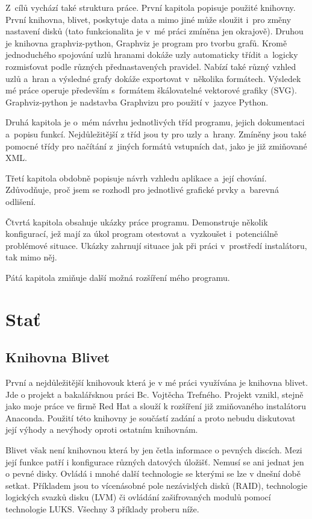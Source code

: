 \documentclass[color,table,oneside,nolot,nolof]{fithesis}
\begin{document}
	Z~cílů vychází také struktura práce. První kapitola popisuje použité knihovny. První knihovna, blivet\cite{blivet}, poskytuje data a mimo jiné může sloužit i~pro změny 
	nastavení disků (tato funkcionalita je v~mé práci zmíněna jen okrajově). Druhou je knihovna graphviz-python\cite{graphviz-python}, Graphviz je program pro tvorbu grafů. Kromě
	jednoduchého spojování uzlů hranami dokáže uzly automaticky třídit a~logicky rozmisťovat podle různých přednastavených pravidel. Nabízí také různý vzhled uzlů
	a~hran a výsledné grafy dokáže exportovat v~několika formátech. Výsledek mé práce operuje především s~formátem škálovatelné vektorové grafiky (SVG). Graphviz-python je 
	nadstavba Graphvizu pro použití v~jazyce Python.

	Druhá kapitola je o~mém návrhu jednotlivých tříd programu, jejich dokumentaci a~popisu funkcí. Nejdůležitější z tříd jsou ty pro uzly a~hrany. Zmíněny jsou také pomocné třídy 
	pro načítání z~jiných formátů vstupních dat, jako je již zmiňované XML.

	Třetí kapitola obdobně popisuje návrh vzhledu aplikace a~její chování. Zdůvodňuje, proč jsem se rozhodl pro jednotlivé grafické prvky a~barevná odlišení.

	Čtvrtá kapitola obsahuje ukázky práce programu. Demonstruje několik konfigurací, jež mají za úkol program otestovat a~vyzkoušet i~potenciálně problémové situace. Ukázky  
	zahrnují situace jak při práci v~prostředí instalátoru, tak mimo něj.

	Pátá kapitola zmiňuje další možná rozšíření mého programu. 

\chapter{Stať}
\section{Knihovna Blivet}
	První a nejdůležitější knihovouk která je v mé práci využívána je knihovna blivet. Jde o projekt a bakalářsknou práci Bc. Vojtěcha Trefného. Projekt vznikl, stejně jako moje
	práce ve firmě Red Hat a slouží k rozšíření již zmiňovaného instalátoru Anaconda. Použití této knihovny je součástí zadání a proto nebudu diskutovat její výhody a nevýhody
	oproti ostatním knihovnám. 

	Blivet však není knihovnou která by jen četla informace o pevných discích. Mezi její funkce patří i konfigurace různých datových úložišť. Nemusí se ani jednat jen o pevné disky.
	Ovládá i mnohé další technologie se kterými se lze v dnešní době setkat. Příkladem jsou to vícenásobné pole nezávislých disků (RAID), technologie logických svazků disku (LVM) či 
	ovládání zašifrovaných modulů pomocí technologie LUKS. Všechny 3 příklady proberu níže.
\end{document}
